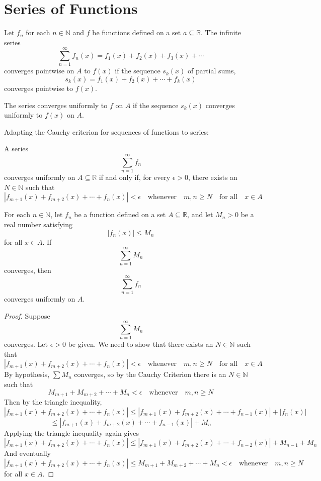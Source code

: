 \section{Series of Functions}
\begin{definition*} Let $f_n$ for each $n\in\mathbb{N}$ and $f$ be functions defined on a set $a\subseteq\mathbb{R}$.  The infinite series
\[
\sum_{n=1}^\infty f_n(x) = f_1(x)+f_2(x)+f_3(x)+\cdots
\]
converges pointwise on $A$ to $f(x)$ if the sequence $s_k(x)$ of partial sums,
\[
s_k(x) = f_1(x)+f_2(x)+\cdots+f_k(x)
\] 
converges pointwise to $f(x)$.
\par\vspace{0.3 cm}
The series converges uniformly to $f$ on $A$ if the sequence $s_k(x)$ converges uniformly to $f(x)$ on $A$. 
\end{definition*}
\par\vspace{0.4 cm}
Adapting the Cauchy criterion for sequences of functions to series:
\par\vspace{0.4 cm}
\begin{theorem} A series
\[
\sum_{n=1}^\infty f_n
\]
converges uniformly on $A\subseteq\mathbb{R}$ if and only if, for every $\epsilon>0$, there exists an $N\in\mathbb{N}$ such that 
\[
|f_{m+1}(x)+f_{m+2}(x)+\cdots+f_n(x)| < \epsilon \quad\mbox{whenever}\quad m,n\geq N\quad\mbox{for all}\quad x\in A
\]
\end{theorem}
\par\vspace{0.4 cm}
\begin{theorem} For each $n\in\mathbb{N}$, let $f_n$ be a function defined on a set $A\subseteq\mathbb{R}$, and let $M_n>0$ be a real number satisfying
\[
|f_n(x)| \leq M_n
\]
for all $x\in A$.  If
\[
\sum_{n=1}^\infty M_n
\]
converges, then
\[
\sum_{n=1}^\infty f_n
\]
converges uniformly on $A$.
\end{theorem}
\par\vspace{0.4 cm}
\begin{proof}
Suppose 
\[
\sum_{n=1}^\infty M_n
\]
converges.
Let $\epsilon>0$ be given.  We need to show that there exists an $N\in\mathbb{N}$ such that
\[
|f_{m+1}(x)+f_{m+2}(x)+\cdots+f_n(x)| < \epsilon\quad\mbox{whenever}\quad m,n\geq N\quad\mbox{for all}\quad x\in A 
\]
By hypothesis, $\sum M_n$ converges, so by the Cauchy Criterion there is an $N\in\mathbb{N}$ such that
\[
M_{m+1}+M_{m+2}+\cdots+M_n < \epsilon\quad\mbox{whenever}\quad m,n \geq N
\] 
Then by the triangle inequality,
\[
|f_{m+1}(x)+f_{m+2}(x)+\cdots+f_n(x)| \leq |f_{m+1}(x)+f_{m+2}(x)+\cdots+f_{n-1}(x)|+|f_n(x)|
\]
\[
\leq |f_{m+1}(x)+f_{m+2}(x)+\cdots+f_{n-1}(x)|+M_n  
\]
Applying the triangle inequality again gives
\[
|f_{m+1}(x)+f_{m+2}(x)+\cdots+f_n(x)| \leq |f_{m+1}(x)+f_{m+2}(x)+\cdots+f_{n-2}(x)|+M_{n-1}+M_n
\]
And eventually
\[
|f_{m+1}(x)+f_{m+2}(x)+\cdots+f_n(x)| \leq M_{m+1}+M_{m+2}+\cdots+M_n < \epsilon\quad\mbox{whenever}\quad m,n\geq N
\]
for all $x\in A$.
\end{proof}
